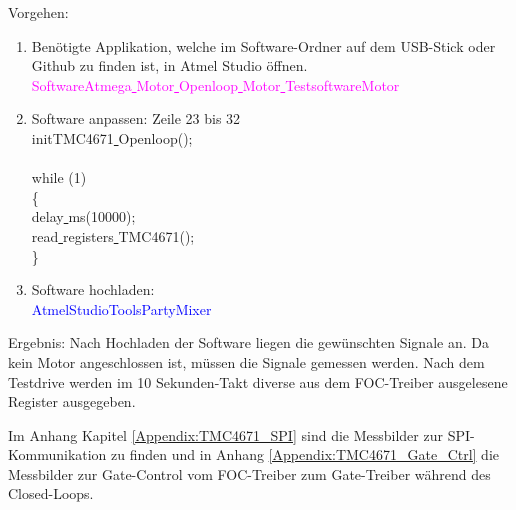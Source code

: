 Vorgehen:
\begin{enumerate}
\item Benötigte Applikation, welche im Software-Ordner auf dem USB-Stick oder Github \cite{aebi_projekt-6softwareatmega_2020} zu finden ist, in Atmel Studio öffnen.\\
\textcolor{magenta}{Software\textrightarrow Atmega\underline{ }Motor\underline{ }Openloop\underline{ }Motor\underline{ }Testsoftware\textrightarrow Motor}\\

\item Software anpassen: Zeile 23 bis 32\\
\textcolor{OliveGreen}{
	initTMC4671\underline{ }Openloop();\\
\\
    while (1) \\
    \{\\
		\underline{ }delay\underline{ }ms(10000);\\
		read\underline{ }registers\underline{ }TMC4671();\\
    \}
}\\

\item Software hochladen:\\
\textcolor{blue}{AtmelStudio\textrightarrow Tools\textrightarrow PartyMixer}\\
\end{enumerate}

Ergebnis: Nach Hochladen der Software liegen die gewünschten Signale an. Da kein Motor angeschlossen ist, müssen die Signale gemessen werden. Nach dem Testdrive werden im 10 Sekunden-Takt diverse aus dem FOC-Treiber ausgelesene Register ausgegeben.

Im Anhang Kapitel \ref{Appendix:TMC4671_SPI} sind die Messbilder zur SPI- Kommunikation zu finden und in Anhang \ref{Appendix:TMC4671_Gate_Ctrl} die Messbilder zur Gate-Control vom FOC-Treiber zum Gate-Treiber während des Closed-Loops.